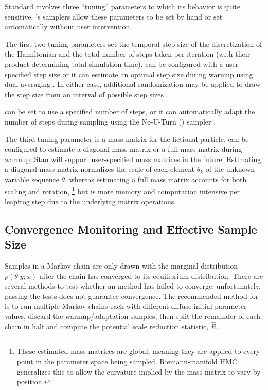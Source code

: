 Standard \HMC involves three ``tuning'' parameters to which its
behavior is quite sensitive.  \Stan's samplers allow these parameters
to be set by hand or set automatically without user intervention.

The first two tuning parameters set the temporal step size of the
discretization of the Hamiltonian and the total number of steps taken
per iteration (with their product determining total simulation time).
\Stan can be configured with a user-specified step size or it can
estimate an optimal step size during warmup using dual averaging
\citep{Nesterov:2009, Hoffman-Gelman:2011, Hoffman-Gelman:2013}.  
In either case, additional randomization may be applied to draw the 
step size from an interval of possible step sizes \citep{Neal:2011}.

\Stan can be set to use a specified number of steps, or it can
automatically adapt the number of steps during sampling using the
No-U-Turn (\NUTS) sampler 
\citep{Hoffman-Gelman:2011, Hoffman-Gelman:2013}.  

The third tuning parameter is a mass matrix for the fictional
particle.  \Stan can be configured to estimate a diagonal mass matrix
or a full mass matrix during warmup; Stan will support user-specified
mass matrices in the future.  Estimating a diagonal mass matrix
normalizes the scale of each element $\theta_k$ of the unknown
variable sequence $\theta$, whereas estimating a full mass matrix
accounts for both scaling and rotation,%
%
\footnote{These estimated mass matrices are global, meaning they are
  applied to every point in the parameter space being sampled.
  Riemann-manifold HMC generalizes this to allow the curvature implied
  by the mass matrix to vary by position.}
%
but is more memory and computation intensive per leapfrog step due to
the underlying matrix operations.

\subsection{Convergence Monitoring and Effective Sample Size}

Samples in a Markov chain are only drawn with the marginal
distribution $p(\theta|y;x)$ after the chain has converged to its
equilibrium distribution.  There are several methods to test whether
an \MCMC method has failed to converge; unfortunately, passing the
tests does not guarantee convergence.  The recommended method for
\Stan is to run multiple Markov chains each with different diffuse
initial parameter values, discard the warmup/adaptation samples, then
split the remainder of each chain in half and compute the potential
scale reduction statistic, $\hat{R}$ \citep{GelmanRubin:1992}.

